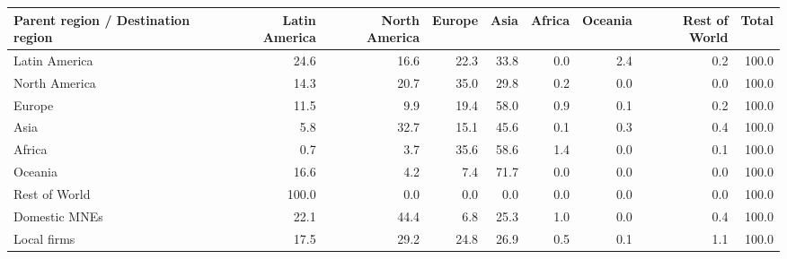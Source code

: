 \begin{tabular}{lrrrrrrrr}
\toprule
Parent region / Destination region & Latin America & North America & Europe & Asia & Africa & Oceania & Rest of World & Total \\
\midrule
Latin America & 24.6 & 16.6 & 22.3 & 33.8 & 0.0 & 2.4 & 0.2 & 100.0 \\
North America & 14.3 & 20.7 & 35.0 & 29.8 & 0.2 & 0.0 & 0.0 & 100.0 \\
Europe & 11.5 & 9.9 & 19.4 & 58.0 & 0.9 & 0.1 & 0.2 & 100.0 \\
Asia & 5.8 & 32.7 & 15.1 & 45.6 & 0.1 & 0.3 & 0.4 & 100.0 \\
Africa & 0.7 & 3.7 & 35.6 & 58.6 & 1.4 & 0.0 & 0.1 & 100.0 \\
Oceania & 16.6 & 4.2 & 7.4 & 71.7 & 0.0 & 0.0 & 0.0 & 100.0 \\
Rest of World & 100.0 & 0.0 & 0.0 & 0.0 & 0.0 & 0.0 & 0.0 & 100.0 \\
Domestic MNEs & 22.1 & 44.4 & 6.8 & 25.3 & 1.0 & 0.0 & 0.4 & 100.0 \\
Local firms & 17.5 & 29.2 & 24.8 & 26.9 & 0.5 & 0.1 & 1.1 & 100.0 \\
\bottomrule
\end{tabular}
